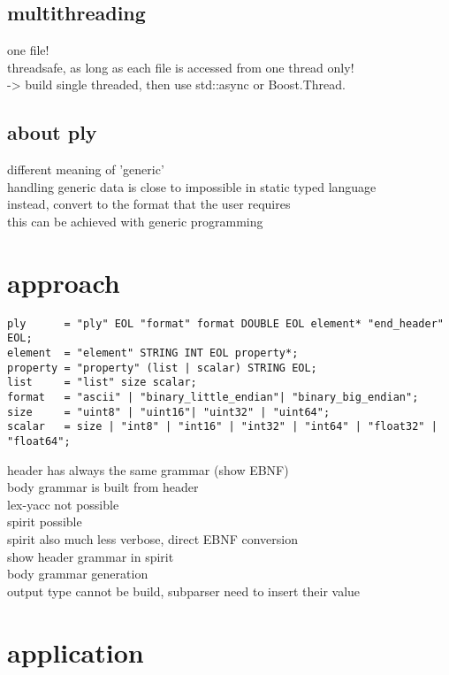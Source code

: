 \documentclass[a4paper,parskip=half]{scrartcl}
\begin{document}
\subsection{multithreading}
%
one file!\\
threadsafe, as long as each file is accessed from one thread only!\\
-> build single threaded, then use std::async or Boost.Thread.\\

\subsection{about ply}
different meaning of 'generic'\\
handling generic data is close to impossible in static typed language\\
instead, convert to the format that the user requires\\
this can be achieved with generic programming\\

\section{approach}
%
\begin{lstlisting}
ply      = "ply" EOL "format" format DOUBLE EOL element* "end_header" EOL;
element  = "element" STRING INT EOL property*;
property = "property" (list | scalar) STRING EOL;
list     = "list" size scalar;
format   = "ascii" | "binary_little_endian"| "binary_big_endian";
size     = "uint8" | "uint16"| "uint32" | "uint64";
scalar   = size | "int8" | "int16" | "int32" | "int64" | "float32" | "float64";
\end{lstlisting}

header has always the same grammar (show EBNF)\\
body grammar is built from header\\
lex-yacc not possible\\
spirit possible\\
spirit also much less verbose, direct EBNF conversion\\
show header grammar in spirit\\
body grammar generation\\
output type cannot be build, subparser need to insert their value\\

\section{application}
%
\end{document}
